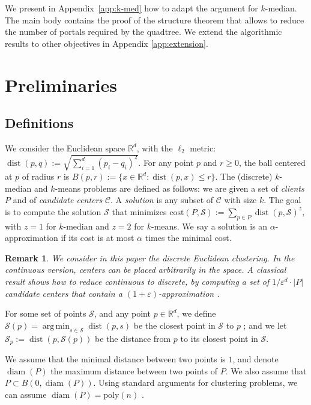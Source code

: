 \documentclass[11pt]{article}
\newtheorem{remark}[theorem]{Remark}
\newcommand{\R}{\mathbb R}
\newcommand{\eps}{\varepsilon}
\newcommand{\poly}{\mathrm{ poly}}
\newcommand{\cost}{\mathrm{cost}}
\DeclareMathOperator*{\argmin}{arg\,min}
\newcommand{\calC}{\mathcal {C}}
\newcommand{\calS}{\mathcal {S}}
\DeclareMathOperator{\dist}{dist}
\DeclareMathOperator{\diam}{diam}
\begin{document}
We present in Appendix~\ref{app:k-med} how to adapt the argument for $k$-median. 
The main body contains the proof of the structure theorem that allows to reduce the number of portals required by the quadtree. 
We  extend the algorithmic results to other objectives in Appendix \ref{app:extension}.




\section{Preliminaries}\label{sec:prelim}
\subsection{Definitions}

We consider the Euclidean space $\R^d$, with the $\ell_2$ metric: $\dist(p, q) := \sqrt{\sum_{i=1}^d (p_i - q_i)^2}$. 
For any point $p$ and $r \geq 0$, the ball centered at $p$ of radius $r$ is $B(p,r) := \{x \in \R^d: \dist(p, x) \leq r\}$.
The (discrete) $k$-median and $k$-means problems are defined as follows: we are given a set of \emph{clients} $P$ and of \emph{candidate centers} $\calC$. A \emph{solution} is any subset of $\calC$ with size $k$. 
The goal is to compute the solution $\calS$ that minimizes $\cost(P, \calS) := \sum_{p \in P} \dist(p, \calS)^z$, with $z=1$ for $k$-median and $z=2$ for $k$-means.
We say a solution is an $\alpha$-approximation if its cost is at most $\alpha$ times the minimal cost.


\begin{remark}\label{rem:cont}
    We consider in this paper the \emph{discrete} Euclidean clustering. In the continuous version, centers can be placed arbitrarily in the space. A classical result shows how to reduce continuous to discrete, by computing a set of $1/\eps^d \cdot |P|$ candidate centers that contain a $(1+\eps)$-approximation \cite{Matousek00}.
\end{remark}


For some set of points $\calS$, and any point $p \in \R^d$, we define $\calS(p) = \argmin_{s \in \calS} \dist(p, s)$ be the closest point in $\calS$ to $p$ ; and we let $\calS_p :=\dist(p, \calS(p) )$ be the distance from $p$ to its closest point in $\calS$.

We assume that the minimal distance between two points is $1$, and denote $\diam(P)$ the maximum distance between two points of $P$. We also assume that $P \subset B(0, \diam(P))$. Using standard arguments for clustering problems, we can assume $\diam(P) = \poly(n)$ \cite{CohenAddadFS19}.
\end{document}
